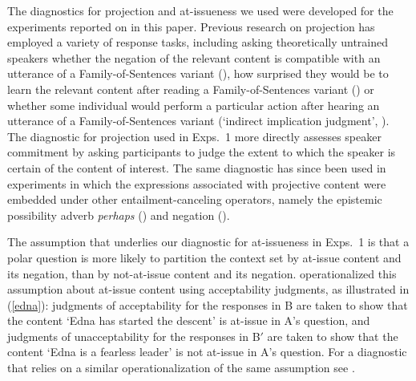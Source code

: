 \documentclass[11pt,fleqn]{article}
\newcommand{\6}{\mbox{$[\hspace*{-.6mm}[$}}
\newcommand{\9}{\mbox{$]\hspace*{-.6mm}]$}}
\begin{document}
The diagnostics for projection and at-issueness we used were developed for the experiments reported on in this paper. Previous research on projection has employed a variety of response tasks, including asking theoretically untrained speakers whether the negation of the relevant content is compatible with an utterance of a Family-of-Sentences variant (\citealt{xue-onea11}), how surprised they would be to learn the relevant content after reading a Family-of-Sentences variant (\citealt{smith-hall11}) or whether some individual would perform a particular action after hearing an utterance of a Family-of-Sentences variant (`indirect implication judgment', \citealt{brst-lang11}). The diagnostic for projection used in Exps.~1 more directly assesses speaker commitment by asking participants to judge the extent to which the speaker is certain of the content of interest. The same diagnostic has since been used in experiments in which the expressions associated with projective content were embedded under other entailment-canceling operators, namely the epistemic possibility adverb {\em perhaps} (\citealt{tonhauser-salt26}) and negation (\citealt*{stevens-etal2017}).

The assumption that underlies our diagnostic for at-issueness in Exps.~1 is that a polar question is more likely to partition the context set by at-issue content and its negation, than by not-at-issue content and its negation. \citet{amaral-etal07} operationalized this assumption about at-issue content using acceptability judgments, as illustrated in (\ref{edna}): judgments of acceptability for the responses in B are taken to show that the content `Edna has started the descent' is at-issue in A's question, and judgments of unacceptability for the responses in B$'$ are taken to show that the content `Edna is a fearless leader' is not at-issue in A's question.  For a diagnostic that relies on a similar operationalization of the same assumption see \citealt{tonhauser-sula6}. 
\end{document}
